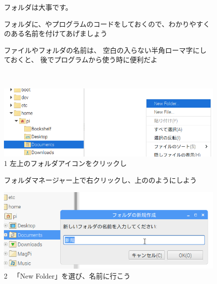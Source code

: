 \documentclass[a4paper,12pt]{jarticle}
\begin{document}
\begin{figure}[hb]
  \centering
  \begin{minipage}{0.9\textwidth}
    {	\large
      フォルダは大事です。

      フォルダに、やプログラムのコードをしておくので、わかりやすくのある名前を付けてあげましょう

      \bigskip
      ファイルやフォルダの名前は、
      空白の入らない半角ローマ字にしておくと、
      後でプログラムから使う時に便利だよ
    }
  \end{minipage}
\end{figure}
\clearpage
\begin{figure}[ht]
  \vspace{8mm}\\
  \centering
  \begin{minipage}{0.9\textwidth}
   \includegraphics[width=\linewidth]{textbook-img034.png}
    1
    左上のフォルダアイコンをクリックし

    フォルダマネージャー上で右クリックし、上ののようにしよう
  \end{minipage}
  \vfill

  \centering
  \begin{minipage}{0.9\textwidth}
   \includegraphics[width=\linewidth]{textbook-img036.png}
    2
    \ 「New Folder」を選び、名前に行こう
  \end{minipage}
  \vfill


\end{figure}
\end{document}
